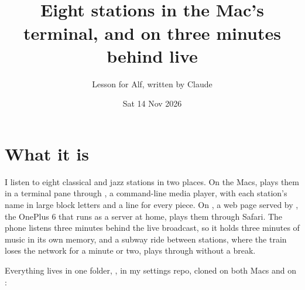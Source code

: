 \documentclass[11pt,a4paper]{article}
\title{\emo{radio}\ \name{Radio}\\[0.3em]
  \large Eight stations in the Mac's terminal, and on \name{AlfPHONE} three minutes behind live}
\author{Lesson for Alf, written by Claude}
\date{Sat 14 Nov 2026}
\begin{document}
\maketitle

\section*{What it is}

I listen to eight classical and jazz stations in two places. %
On the Macs,  plays them in a terminal pane through , a command-line media player, with each station's name in large block letters and a line for every piece.  On , a web page served by , the OnePlus 6 that runs as a server at home, plays them through Safari. The phone listens three minutes behind the live broadcast, so it holds three minutes of music in its own memory, and a subway ride between stations, where the train loses the network for a minute or two, plays through without a break.

Everything lives in one folder, , in my settings repo, cloned on both Macs and on : 
\end{document}
